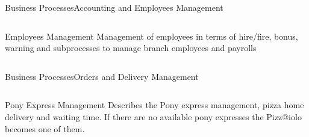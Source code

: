 \documentclass{beamer}
\begin{document}
\begin{frame}{Business Processes}{Accounting and Employees Management}
 \begin{columns}
  \begin{block}{Employees Management}
  	Management of employees in terms of hire/fire, bonus, warning and subprocesses to manage branch employees and payrolls	
  \end{block}
 \end{columns}
\end{frame}

\begin{frame}{Business Processes}{Orders and Delivery Management}
  \begin{columns}
  \begin{block}{Pony Express Management}
	Describes the Pony express management, pizza home delivery and waiting time.
	If there are no available pony expresses the Pizz@iolo becomes one of them.   
  \end{block}
 \end{columns}
\end{frame}
\end{document}
